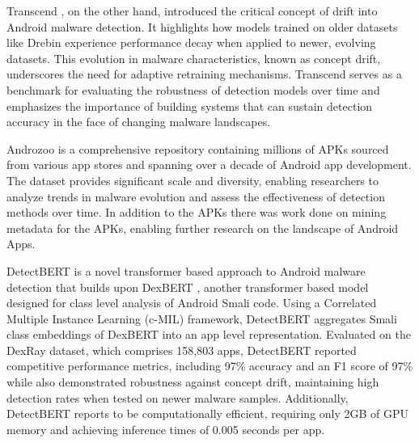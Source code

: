 Transcend \cite{transcend}, on the other hand, introduced the critical concept of drift into Android malware detection.
It highlights how models trained on older datasets like Drebin experience performance decay when applied to newer, evolving datasets.
This evolution in malware characteristics, known as concept drift, underscores the need for adaptive retraining mechanisms.
Transcend serves as a benchmark for evaluating the robustness of detection models over time and emphasizes the importance of building systems that can sustain detection accuracy in the face of changing malware landscapes.

Androzoo \cite{androzoo} is a comprehensive repository containing millions of APKs sourced from various app stores and spanning over a decade of Android app development.
The dataset provides significant scale and diversity, enabling researchers to analyze trends in malware evolution and assess the effectiveness of detection methods over time.
In addition to the APKs there was work done on mining metadata for the APKs, enabling further research on the landscape of Android Apps.

DetectBERT \cite{detectbert} is a novel transformer based approach to Android malware detection that builds upon DexBERT \cite{dexbert}, another transformer based model designed for class level analysis of Android Smali code.
Using a Correlated Multiple Instance Learning (c-MIL) framework, DetectBERT aggregates Smali class embeddings of DexBERT into an app level representation.
Evaluated on the DexRay \cite{dexray} dataset, which comprises 158,803 apps, DetectBERT reported competitive performance metrics, including 97\% accuracy and an F1 score of 97\% while also demonstrated robustness against concept drift, maintaining high detection rates when tested on newer malware samples.
Additionally, DetectBERT reports to be computationally efficient, requiring only 2GB of GPU memory and achieving inference times of 0.005 seconds per app.


